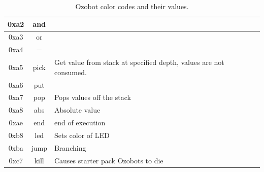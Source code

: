 \documentclass[oneside,%
                    author={Malak Hajji},
                    degree={BSc},
                    title={Designing An Accessible Computational Toolkit For Students},
                  subtitle={With Mixed Visual Abilities}]{dissertation}
\begin{document}
\begin{table}
\begin{tabular}{|c|c|l|}
0xa2 &and &\\ \hline 
0xa3 &or &\\ \hline 
0xa4 &= &\\ \hline 
0xa5 &pick &Get value from stack at specified depth, values are not consumed.
\\ \hline 
0xa6 &put &\\ \hline 
0xa7 &pop &Pops values off the stack\\ \hline 
0xa8 &abs &Absolute value\\ \hline 
0xae &end  &end of execution\\ \hline 
0xb8 &led  &Sets color of LED\\ \hline 
0xba &jump  &Branching \\ \hline 
0xc7 &kill &Causes starter pack Ozobots to die \\ \hline 

\hline
\end{tabular}
\caption{Ozobot color codes and their values\cite{ashley}.}
\label{tab-bytecode}
\end{table}
\end{document}
